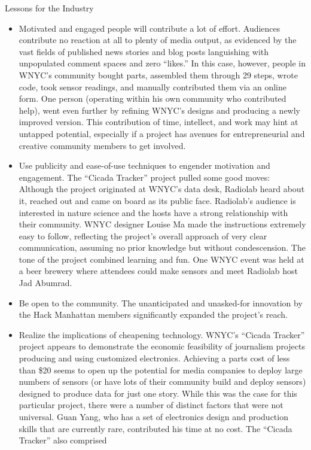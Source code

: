 Lessons for the Industry
\begin{itemize}
\item Motivated and engaged people will contribute a lot of effort.
Audiences contribute no reaction at all to plenty of media output,
as evidenced by the vast fields of published news stories and blog
posts languishing with unpopulated comment spaces and zero ``likes.''
In this case, however, people in WNYC's community bought parts,
assembled them through 29 steps, wrote code, took sensor readings,
and manually contributed them via an online form. One person (operating
within his own community who contributed help), went even
further by refining WNYC's designs and producing a newly improved
version. This contribution of time, intellect, and work may hint at
untapped potential, especially if a project has avenues for entrepreneurial
and creative community members to get involved.
\item Use publicity and ease-of-use techniques to engender
motivation and engagement.
The ``Cicada Tracker'' project pulled some good moves: Although
the project originated at WNYC's data desk, Radiolab heard about
it, reached out and came on board as its public face. Radiolab's audience
is interested in nature science and the hosts have a strong relationship
with their community. WNYC designer Louise Ma made the
instructions extremely easy to follow, reflecting the project's overall
approach of very clear communication, assuming no prior knowledge
but without condescension. The tone of the project combined
learning and fun. One WNYC event was held at a beer brewery where
attendees could make sensors and meet Radiolab host Jad Abumrad.
\item Be open to the community.
The unanticipated and unasked-for innovation by the Hack Manhattan
members significantly expanded the project's reach.
\item Realize the implications of cheapening technology.
WNYC's ``Cicada Tracker'' project appears to demonstrate the economic
feasibility of journalism projects producing and using customized
electronics. Achieving a parts cost of less than \$20 seems to
open up the potential for media companies to deploy large numbers
of sensors (or have lots of their community build and deploy sensors)
designed to produce data for just one story.
While this was the case for this particular project, there were a number
of distinct factors that were not universal. Guan Yang, who has a
set of electronics design and production skills that are currently rare,
contributed his time at no cost. The ``Cicada Tracker'' also comprised

\end{itemize}
